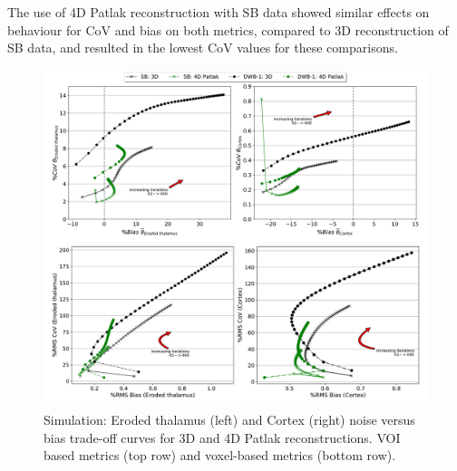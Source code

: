 The use of 4D Patlak reconstruction with SB data showed similar effects on behaviour for CoV and bias on both metrics, compared to 3D reconstruction of SB data, and resulted in the lowest CoV values for these comparisons.

\begin{figure} [ht!]
\centering
\includegraphics[scale=0.42,angle=0]{3_Results/3_2_Dynamic_Reconstruction_SimulationStudy/figures/VOI/3_1.pdf}
\caption{Simulation: Eroded thalamus (left) and Cortex (right) noise versus bias trade-off curves for 3D and 4D Patlak reconstructions. 
VOI based metrics (top row) and voxel-based metrics (bottom row).
}
\label{fig:3_1_Patlak}
\end{figure} 

